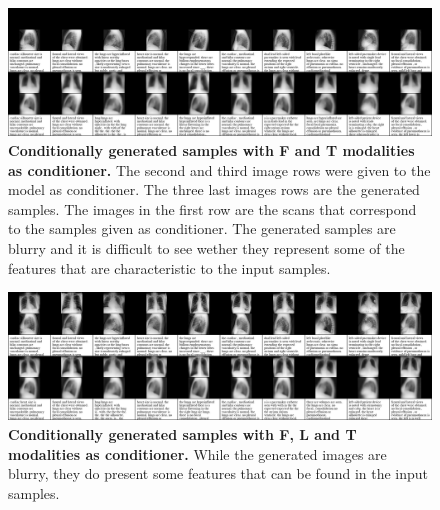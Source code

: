 \begin{figure}
    \centering
    \includegraphics[width=\textwidth]{data/cond_gen/Lateral_text}
    \caption{
        \textbf{Conditionally generated samples with F and T modalities as conditioner.} The second and third image rows were given to the model as conditioner. The three last images rows are the generated samples. The images in the first row are the scans that correspond to the samples given as conditioner. The generated samples are blurry and it is difficult to see wether they represent some of the features that are characteristic to the input samples.
    }
    \label{fig:fig_cond_lattext}
\end{figure}

\begin{figure}
    \centering
    \includegraphics[width=\textwidth]{data/cond_gen/Lateral_PA_text}
    \caption{
        \textbf{Conditionally generated samples with F, L and T modalities as conditioner.} While the generated images are blurry, they do present some features that can be found in the input samples.
    }
    \label{fig:fig_cond_latPAtext}
\end{figure}


